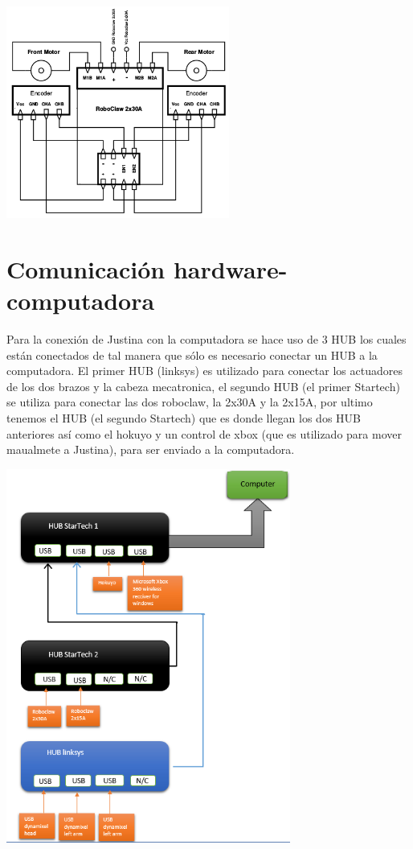 \documentclass[user_manual.tex]{subfiles}
\begin{document}
\begin{center}
\includegraphics[width=0.55\textwidth]{Figures/Hardware/Esquematicos/Roboclaw_2.png}
\label{fig:Hardware:Partes:Diagrama:Esquematico:Roboclaw:2}
\end{center}

\section{Comunicación hardware-computadora}
Para la conexión de Justina con la computadora se hace uso de 3 HUB los cuales están conectados de tal manera que sólo es necesario conectar
un HUB a la computadora. El primer HUB (linksys) es utilizado para conectar los actuadores de los dos brazos y la cabeza mecatronica,
el segundo HUB (el primer Startech) se utiliza para conectar las dos roboclaw, la 2x30A y la 2x15A, por ultimo tenemos el HUB (el segundo 
Startech) que es donde llegan los dos HUB anteriores así como el hokuyo y un control de xbox (que es utilizado para mover maualmete a Justina), para ser enviado a la computadora.
\begin{center}
\includegraphics[width=0.7\textwidth]{Figures/Hardware/Diagramas/HUB.png}
\label{fig:Hardware:Diagramas:Justina:HUBs}
\end{center}
\end{document}
